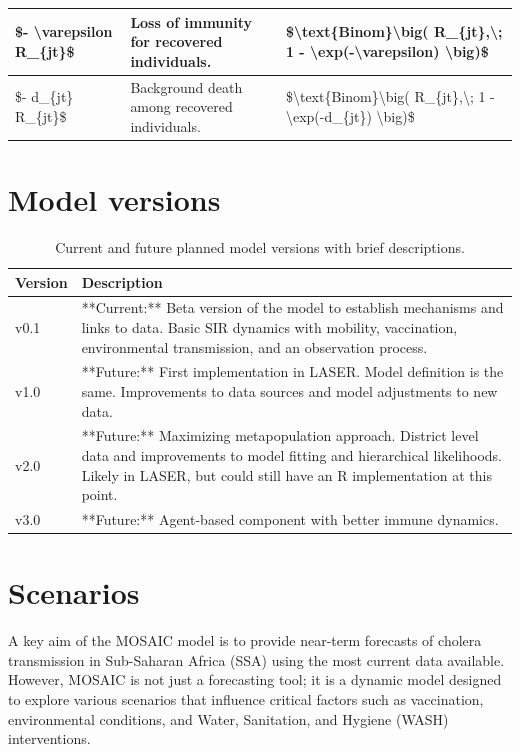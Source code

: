 \documentclass[
]{book}
\begin{document}
\begin{table}
\begin{tabular}[t]{l|l|l}
\hline
\$- \textbackslash{}varepsilon R\_\{jt\}\$ & Loss of immunity for recovered individuals. & \$\textbackslash{}text\{Binom\}\textbackslash{}big( R\_\{jt\},\textbackslash{}; 1 - \textbackslash{}exp(-\textbackslash{}varepsilon) \textbackslash{}big)\$\\
\hline
\$- d\_\{jt\} R\_\{jt\}\$ & Background death among recovered individuals. & \$\textbackslash{}text\{Binom\}\textbackslash{}big( R\_\{jt\},\textbackslash{}; 1 - \textbackslash{}exp(-d\_\{jt\}) \textbackslash{}big)\$\\
\hline
\end{tabular}
\end{table}

\chapter{Model versions}\label{model-versions}

\begin{table}

\caption{\label{tab:unnamed-chunk-1}Current and future planned model versions with brief descriptions.}
\centering
\begin{tabular}[t]{l|l}
\hline
Version & Description\\
\hline
v0.1 & **Current:** Beta version of the model to establish mechanisms and links to data. Basic SIR dynamics with mobility, vaccination, environmental transmission, and an observation process.\\
\hline
v1.0 & **Future:** First implementation in LASER. Model definition is the same. Improvements to data sources and model adjustments to new data.\\
\hline
v2.0 & **Future:** Maximizing metapopulation approach. District level data and improvements to model fitting and hierarchical likelihoods. Likely in LASER, but could still have an R implementation at this point.\\
\hline
v3.0 & **Future:** Agent-based component with better immune dynamics.\\
\hline
\end{tabular}
\end{table}

\chapter{Scenarios}\label{scenarios}

A key aim of the MOSAIC model is to provide near-term forecasts of cholera transmission in Sub-Saharan Africa (SSA) using the most current data available. However, MOSAIC is not just a forecasting tool; it is a dynamic model designed to explore various scenarios that influence critical factors such as vaccination, environmental conditions, and Water, Sanitation, and Hygiene (WASH) interventions.
\end{document}
